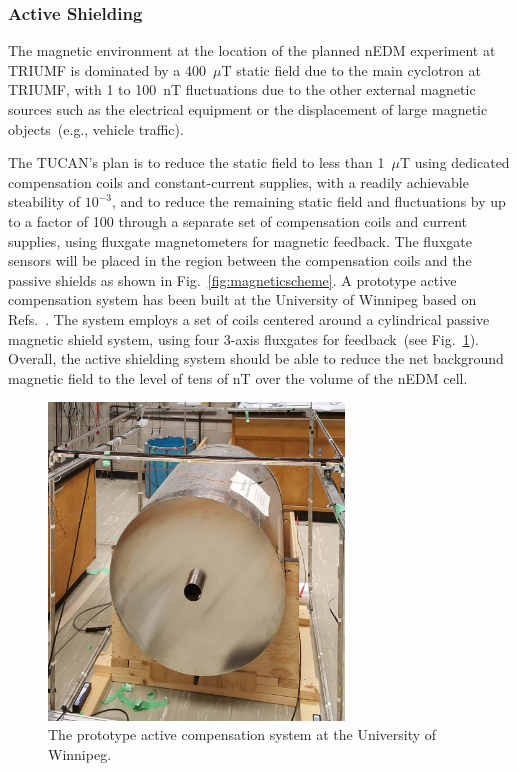 \subsubsection{Active Shielding}

The magnetic environment at the location of the planned nEDM
experiment at TRIUMF is dominated by a 400~$\mu$T static field due to
the main cyclotron at TRIUMF, with 1 to 100~nT fluctuations due to the
other external magnetic sources such as the electrical equipment or
the displacement of large magnetic objects~(e.g., vehicle traffic).

The TUCAN's plan is to reduce the static field to less than 1~$\mu$T
using dedicated compensation coils and constant-current supplies, with
a readily achievable steability of $10^{-3}$, and to reduce the
remaining static field and fluctuations by up to a factor of 100
through a separate set of compensation coils and current supplies,
using fluxgate magnetometers for magnetic feedback. The fluxgate
sensors will be placed in the region between the compensation coils
and the passive shields as shown in Fig.~\ref{fig:magneticscheme}.  A
prototype active compensation system has been built at the University
of Winnipeg based on Refs.~\cite{beatrice,afach2014dynamic}. The
system employs a set of coils centered around a cylindrical passive
magnetic shield system, using four 3-axis fluxgates for feedback~(see
Fig.~\ref{fig:prototype_active}). Overall, the active shielding system
should be able to reduce the net background magnetic field to the
level of tens of nT over the volume of the nEDM cell.


\begin{figure}[h!]
  \centering
  \includegraphics[width=0.7\textwidth]{active_prototype.jpg}
  \caption{The prototype active compensation system at the University
    of Winnipeg.}
  \label{fig:prototype_active}
\end{figure}

